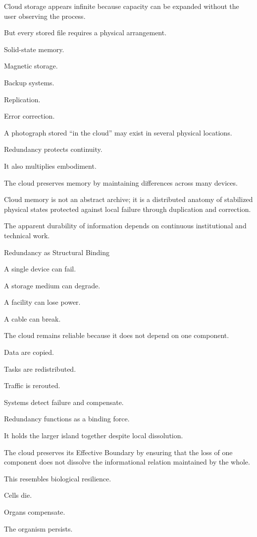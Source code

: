 Cloud storage appears infinite because capacity can be expanded without the user observing the process.

But every stored file requires a physical arrangement.

Solid-state memory.

Magnetic storage.

Backup systems.

Replication.

Error correction.

A photograph stored “in the cloud” may exist in several physical locations.

Redundancy protects continuity.

It also multiplies embodiment.

The cloud preserves memory by maintaining differences across many devices.

Cloud memory is not an abstract archive; it is a distributed anatomy of stabilized physical states protected against local failure through duplication and correction.

The apparent durability of information depends on continuous institutional and technical work.

Redundancy as Structural Binding

A single device can fail.

A storage medium can degrade.

A facility can lose power.

A cable can break.

The cloud remains reliable because it does not depend on one component.

Data are copied.

Tasks are redistributed.

Traffic is rerouted.

Systems detect failure and compensate.

Redundancy functions as a binding force.

It holds the larger island together despite local dissolution.

The cloud preserves its Effective Boundary by ensuring that the loss of one component does not dissolve the informational relation maintained by the whole.

This resembles biological resilience.

Cells die.

Organs compensate.

The organism persists.

